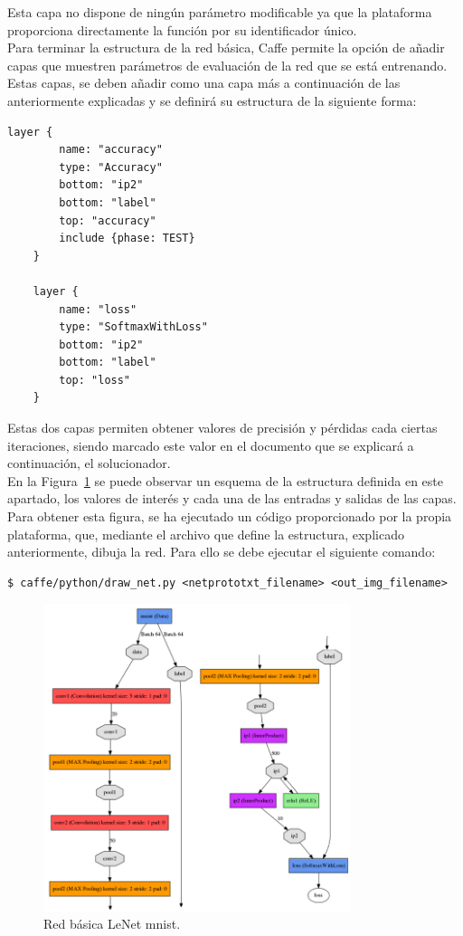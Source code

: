 	Esta capa no dispone de ningún parámetro modificable ya que la plataforma proporciona directamente la función por su identificador único.\\
	
	Para terminar la estructura de la red básica, Caffe permite la opción de añadir capas que muestren parámetros de evaluación de la red que se está entrenando. Estas capas, se deben añadir como una capa más a continuación de las anteriormente explicadas y se definirá su estructura de la siguiente forma:
	\vspace{10pt}
	\begin{lstlisting}[frame=single]
	layer {
		name: "accuracy"
		type: "Accuracy"
		bottom: "ip2"
		bottom: "label"
		top: "accuracy"
		include {phase: TEST}
	}
	
	layer {
		name: "loss"
		type: "SoftmaxWithLoss"
		bottom: "ip2"
		bottom: "label"
		top: "loss"
	}	
	\end{lstlisting}
	
	Estas dos capas permiten obtener valores de precisión y pérdidas cada ciertas iteraciones, siendo marcado este valor en el documento que se explicará a continuación, el solucionador.\\

	En la Figura~\ref{fig.redBasica} se puede observar un esquema de la estructura definida en este apartado, los valores de interés y cada una de las entradas y salidas de las capas. Para obtener esta figura, se ha ejecutado un código proporcionado por la propia plataforma, que, mediante el archivo que define la estructura, explicado anteriormente, dibuja la red. Para ello se debe ejecutar el siguiente comando:
	\vspace{10pt}
	\begin{lstlisting}[frame=single]
	$ caffe/python/draw_net.py <netprototxt_filename> <out_img_filename>
	\end{lstlisting}
	
	\begin{figure}[H]
		\begin{center}
			\includegraphics[width=0.8\textwidth]{figures/Original_net}
			\caption{Red básica LeNet \acrshort{mnist}.}
			\label{fig.redBasica}
		\end{center}
	\end{figure}
	
